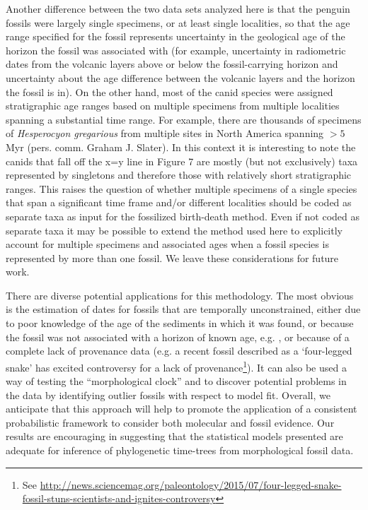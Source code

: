 \documentclass[11pt]{article}
\begin{document}
Another difference between the two data sets analyzed here is that the penguin fossils were largely single specimens, or at least single localities, so that the age range specified for the fossil represents uncertainty in the geological age of the horizon the fossil was associated with (for example, uncertainty in radiometric dates from the volcanic layers above or below the fossil-carrying horizon and uncertainty about the age difference between the volcanic layers and the horizon the fossil is in). 
On the other hand, most of the canid species were assigned stratigraphic age ranges based on multiple specimens from multiple localities spanning a substantial time range. 
For example, there are thousands of specimens of {\it Hesperocyon gregarious} from multiple sites in North America spanning $>5$ Myr (pers. comm. Graham J. Slater). 
In this context it is interesting to note the canids that fall off the x=y line in Figure 7 are mostly (but not exclusively) taxa represented by singletons and therefore those with relatively short stratigraphic ranges. 
This raises the question of whether multiple specimens of a single species that span a significant time frame and/or different localities should be coded as separate taxa as input for the fossilized birth-death method. Even if not coded as separate taxa it may be possible to extend the method used here to explicitly account for multiple specimens and associated ages when a fossil species is represented by more than one fossil. We leave these considerations for future work. 

There are diverse potential applications for this methodology. 
The most obvious is the estimation of dates for fossils that are temporally unconstrained, either due to poor knowledge of the age of the sediments in which it was found, 
or because the fossil was not associated with a horizon of known age, e.g. \cite{Berger2015},
or because of a complete lack of provenance data (e.g. a recent fossil described as a `four-legged snake' has excited controversy for a lack of provenance\footnote{See \url{http://news.sciencemag.org/paleontology/2015/07/four-legged-snake-fossil-stuns-scientists-and-ignites-controversy}}). 
It can also be used a way of testing the ``morphological clock'' and to discover potential problems in the data by identifying outlier fossils with respect to model fit. 
Overall, we anticipate that this approach will help to promote the application of a consistent probabilistic framework to consider both molecular and fossil evidence. Our results are encouraging in suggesting that the statistical models presented are adequate for inference of phylogenetic time-trees from morphological fossil data.
\end{document}
